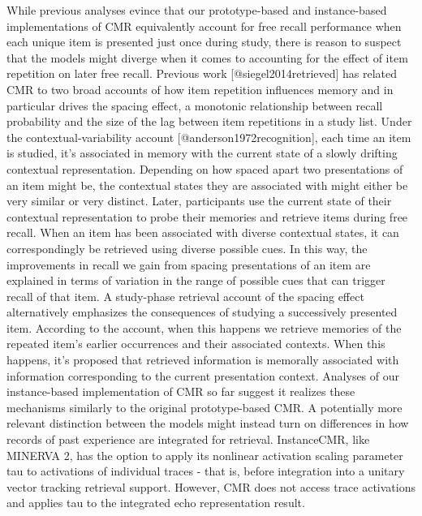 While previous analyses evince that our prototype-based and instance-based implementations of CMR equivalently account for free recall performance when each unique item is presented just once during study, there is reason to suspect that the models might diverge when it comes to accounting for the effect of item repetition on later free recall.\markdownRendererInterblockSeparator
{}Previous work [@siegel2014retrieved] has related CMR to two broad accounts of how item repetition influences memory and in particular drives the spacing effect, a monotonic relationship between recall probability and the size of the lag between item repetitions in a study list. Under the contextual-variability account [@anderson1972recognition], each time an item is studied, it's associated in memory with the current state of a slowly drifting contextual representation. Depending on how spaced apart two presentations of an item might be, the contextual states they are associated with might either be very similar or very distinct. Later, participants use the current state of their contextual representation to probe their memories and retrieve items during free recall. When an item has been associated with diverse contextual states, it can correspondingly be retrieved using diverse possible cues. In this way, the improvements in recall we gain from spacing presentations of an item are explained in terms of variation in the range of possible cues that can trigger recall of that item. A study-phase retrieval account of the spacing effect alternatively emphasizes the consequences of studying a successively presented item. According to the account, when this happens we retrieve memories of the repeated item's earlier occurrences and their associated contexts. When this happens, it's proposed that retrieved information is memorally associated with information corresponding to the current presentation context.\markdownRendererInterblockSeparator
{}Analyses of our instance-based implementation of CMR so far suggest it realizes these mechanisms similarly to the original prototype-based CMR. A potentially more relevant distinction between the models might instead turn on differences in how records of past experience are integrated for retrieval. InstanceCMR, like MINERVA 2, has the option to apply its nonlinear activation scaling parameter \markdownRendererDollarSign{}\markdownRendererBackslash{}tau\markdownRendererDollarSign{} to activations of individual traces - that is, before integration into a unitary vector tracking retrieval support. However, CMR does not access trace activations and applies \markdownRendererDollarSign{}\markdownRendererBackslash{}tau\markdownRendererDollarSign{} to the integrated echo representation result.\markdownRendererInterblockSeparator
